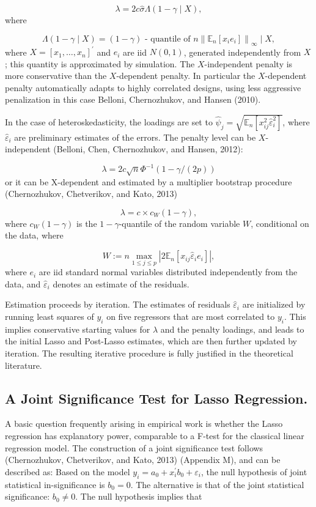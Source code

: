 \documentclass[12pt,a4paper]{article}
\begin{document}
\[
\lambda=2 c \hat{\sigma} \Lambda(1-\gamma \mid X),
\]
where

\[
\Lambda(1-\gamma \mid X)=(1-\gamma) \text { - quantile of } n\left\|\mathbb{E}_n\left[x_i e_i\right]\right\|_{\infty} \mid X,
\]
where $X=\left[x_1, \ldots, x_n\right]^{\prime}$ and $e_i$ are iid $N(0,1)$, generated independently from $X$; this quantity is approximated by simulation. The $X$-independent penalty is more conservative than the $X$-dependent penalty. In particular the $X$-dependent penalty automatically adapts to highly correlated designs, using less aggressive penalization in this case Belloni, Chernozhukov, and Hansen (2010).

In the case of heteroskedasticity, the loadings are set to $\hat{\psi}_j=\sqrt{\mathbb{E}_n\left[x_{i j}^2 \hat{\varepsilon}_i^2\right]}$, where $\hat{\varepsilon}_i$ are preliminary estimates of the errors. The penalty level can be $X$-independent (Belloni, Chen, Chernozhukov, and Hansen, 2012):

\[
\lambda=2 c \sqrt{n} \Phi^{-1}(1-\gamma /(2 p))
\]
or it can be X-dependent and estimated by a multiplier bootstrap procedure (Chernozhukov, Chetverikov, and Kato, 2013)

\[
\lambda=c \times c_W(1-\gamma),
\]
where $c_W(1-\gamma)$ is the $1-\gamma$-quantile of the random variable $W$, conditional on the data, where

\[
W:=n \max _{1 \leq j \leq p}\left|2 \mathbb{E}_n\left[x_{i j} \hat{\varepsilon}_i e_i\right]\right|,
\]
where $e_i$ are iid standard normal variables distributed independently from the data, and $\hat{\varepsilon}_i$ denotes an estimate of the residuals.

Estimation proceeds by iteration. The estimates of residuals $\hat{\varepsilon}_i$ are initialized by running least squares of $y_i$ on five regressors that are most correlated to $y_i$. This implies conservative starting values for $\lambda$ and the penalty loadings, and leads to the initial Lasso and Post-Lasso estimates, which are then further updated by iteration. The resulting iterative procedure is fully justified in the theoretical literature.

\subsection{A Joint Significance Test for Lasso Regression.}
A basic question frequently arising in empirical work is whether the Lasso regression has explanatory power, comparable to a F-test for the classical linear regression model. The construction of a joint significance test follows (Chernozhukov, Chetverikov, and Kato, 2013) (Appendix M), and can be described as: Based on the model $y_i=a_0+x_i^{\prime} b_0+\varepsilon_i$, the null hypothesis of joint statistical in-significance is $b_0=0$. The alternative is that of the joint statistical significance: $b_0 \neq 0$. The null hypothesis implies that
\end{document}

